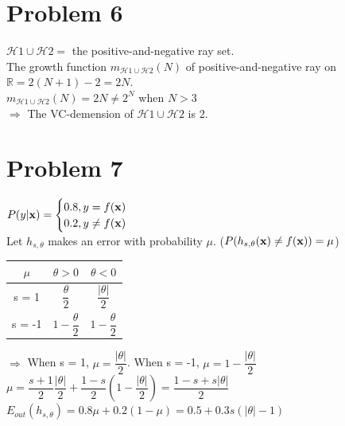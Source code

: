 \documentclass[12pt, a4paper]{article}
\begin{document}
\begin{CJK}{UTF8}{bkai}
	\section*{Problem 6}
		$\mathcal{H}1 \cup \mathcal{H}2 =$ the positive-and-negative ray set. \\
		The growth function $m_{\mathcal{H}1 \cup \mathcal{H}2}(N)$ of positive-and-negative ray on $\mathbb{R} = 2(N+1)-2 = 2N$. \\
		$m_{\mathcal{H}1 \cup \mathcal{H}2}(N) = 2N \neq 2^N$ when $N > 3$ \\
		$\Rightarrow$ The VC-demension of $\mathcal{H}1 \cup \mathcal{H}2$ is 2.
	
	\fontsize{12pt}{20pt} \selectfont
	\section*{Problem 7}
		$P(y|{\bf x}) = 
		\begin{cases}
			0.8, y = f({\bf x}) \\
			0.2, y \neq f({\bf x}) \\
		\end{cases}$\\
		Let $h_{s,\theta}$ makes an error with probability $\mu$. ($P(h_{s,\theta}({\bf x}) \neq f({\bf x}))=\mu$)  \\
		\begin{tabular}[t]{|c|c|c|}
			\hline
			$\mu$ 	& $\theta > 0$ 			& $\theta < 0$ \\
			\hline
			s = 1   	& $\dfrac{\theta}{2}$   & $\dfrac{|\theta|}{2}$ \\
			\hline
			s = -1   	& $1-\dfrac{\theta}{2}$	& $1-\dfrac{\theta}{2}$ \\
			\hline
		\end{tabular}\par
		\vspace{0.5em}\noindent
		$\Rightarrow$ When s = 1, $\mu = \dfrac{|\theta|}{2}$. When s = -1, $\mu = 1-\dfrac{|\theta|}{2}$ \\
		$\mu = \dfrac{s+1}{2} \dfrac{|\theta|}{2} + \dfrac{1-s}{2}(1-\dfrac{|\theta|}{2})
			 = \dfrac{1-s+s|\theta|}{2}$\\
		$E_{out}(h_{s,\theta}) = 0.8\mu+0.2(1-\mu)= 0.5+0.3s(|\theta|-1)$

	\fontsize{12pt}{10pt} \selectfont

\end{CJK}
\end{document}
